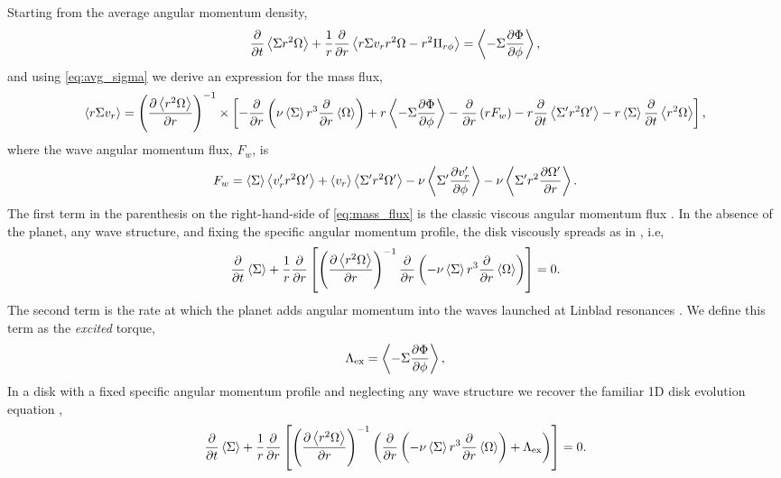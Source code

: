 Starting from the average angular momentum density,
\begin{equation} \label{eq:tot_avg_ang}
\pderiv{t} \avg{ \Sigma r^2 \Omega} + \frac{1}{r} \pderiv{r} \avg{ r\Sigma v_r r^2 \Omega - r^2 \Pi_{r\phi} }= \avg{ - \Sigma \ppderiv{\Phi}{\phi}},
\end{equation}
and using \eqref{eq:avg_sigma} we derive an expression for the mass flux,
\begin{equation} \label{eq:mass_flux}
\avg{r \Sigma v_r} = \left( \ppderiv{\avg{r^2 \Omega}}{r} \right)^{-1} \times \left[ -\pderiv{r} \left( \nu \avg{\Sigma} r^3 \pderiv{r} \avg{\Omega} \right) + r \avg{-\Sigma \ppderiv{\Phi}{\phi}} - \pderiv{r} \left( r F_w \right) - r\pderiv{t}\avg{ \Sigma' r^2 \Omega'} - r\avg{\Sigma} \pderiv{t}\avg{r^2 \Omega} \right] ,
\end{equation}
where the wave angular momentum flux, $F_w$, is 
\begin{equation} \label{eq:wave_flux}
    F_w = \avg{\Sigma} \avg{v_r' r^2 \Omega'} + \avg{v_r} \avg{ \Sigma' r^2 \Omega'} - \nu \avg{ \Sigma' \ppderiv{v_r'}{\phi}} - \nu \avg{ \Sigma'r^2 \ppderiv{\Omega'}{r}} .
\end{equation}
The first term in the parenthesis on the right-hand-side of \eqref{eq:mass_flux} is the classic viscous angular momentum flux . In the absence of the planet, any wave structure, and fixing the specific angular momentum profile, the disk viscously spreads as in \cite{1974MNRAS.168..603L}, i.e,
\begin{equation}
\pderiv{t} \avg{\Sigma} + \frac{1}{r} \pderiv{r} \left[ \left( \ppderiv{\avg{r^2 \Omega}}{r} \right)^{-1}\pderiv{r} \left( - \nu \avg{\Sigma} r^3 \pderiv{r} \avg{\Omega} \right) \right] = 0 .
\end{equation}
The second term is the rate at which the planet adds angular momentum into the waves launched at Linblad resonances \citep{1979ApJ...233..857G,1980ApJ...241..425G}. We define this term as the \emph{excited} torque,
\begin{equation}
\Lambda_\text{ex} = \avg{ - \Sigma \ppderiv{\Phi}{\phi} } ,
\end{equation}
In a disk with a fixed specific angular momentum profile and neglecting any wave structure we recover the familiar 1D disk evolution equation \citep{1986ApJ...309..846L},
\begin{equation} \label{eq:1d_no_wave}
\pderiv{t} \avg{\Sigma} + \frac{1}{r} \pderiv{r} \left[ \left( \ppderiv{\avg{r^2 \Omega}}{r} \right)^{-1} \left( \pderiv{r} \left( - \nu \avg{\Sigma} r^3 \pderiv{r} \avg{\Omega} \right) + \Lambda_\text{ex} \right) \right] = 0 .
\end{equation}

